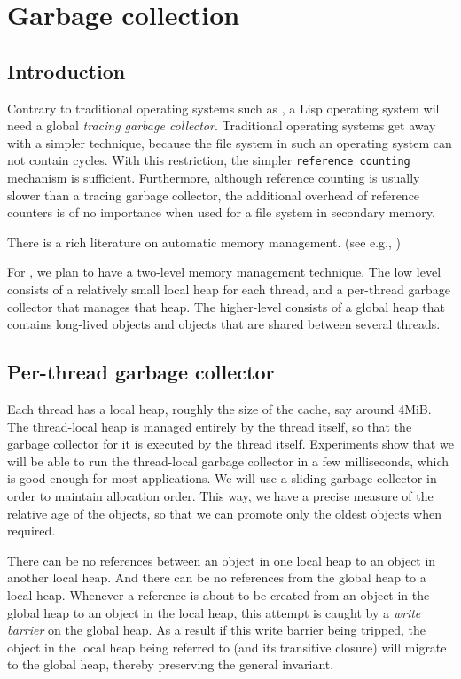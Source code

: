 \chapter{Garbage collection}
\label{chap-garbage-collection}

\section{Introduction}

Contrary to traditional operating systems such as \unix{}, a Lisp
operating system will need a global \emph{tracing garbage collector}.
Traditional operating systems get away with a simpler technique,
because the file system in such an operating system can not contain
cycles.  With this restriction, the simpler \texttt{reference
  counting} mechanism is sufficient.  Furthermore, although reference
counting is usually slower than a tracing garbage collector, the
additional overhead of reference counters is of no importance when
used for a file system in secondary memory.

There is a rich literature on automatic memory management.
(see e.g., \cite{Jones:2011:GCH:2025255})

For \sysname{}, we plan to have a two-level memory management
technique.  The low level consists of a relatively small local heap
for each thread, and a per-thread garbage collector that manages that
heap.  The higher-level consists of a global heap that contains
long-lived objects and objects that are shared between several
threads.

\section{Per-thread garbage collector}

Each thread has a local heap, roughly the size of the cache, say
around 4MiB.  The thread-local heap is managed entirely by the thread
itself, so that the garbage collector for it is executed by the thread
itself.  Experiments show that we will be able to run the thread-local
garbage collector in a few milliseconds, which is good enough for most
applications.  We will use a sliding garbage collector in order to
maintain allocation order.  This way, we have a precise measure of the
relative age of the objects, so that we can promote only the oldest
objects when required. 

There can be no references between an object in one local heap to an
object in another local heap.  And there can be no references from the
global heap to a local heap.  Whenever a reference is about to be
created from an object in the global heap to an object in the local
heap, this attempt is caught by a \emph{write barrier} on the global
heap.  As a result if this write barrier being tripped, the object in
the local heap being referred to (and its transitive closure) will
migrate to the global heap, thereby preserving the general invariant.

